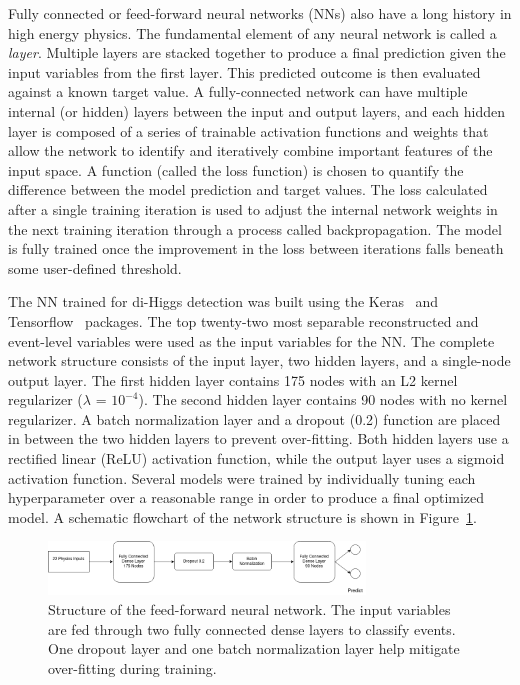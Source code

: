 \label{sec:NN}
Fully connected or feed-forward neural networks (NNs) also have a long history in high energy physics. The fundamental element of any neural network is called a \textit{layer}. Multiple layers are stacked together to produce a final prediction given the input variables from the first layer. This predicted outcome is then evaluated against a known target value. A fully-connected network can have multiple internal (or hidden) layers between the input and output layers, and each hidden layer is composed of a series of trainable activation functions and weights that allow the network to identify and iteratively combine important features of the input space. A function (called the loss function) is chosen to quantify the difference between the model prediction and target values. The loss calculated after a single training iteration is used to adjust the internal network weights in the next training iteration through a process called backpropagation. The model is fully trained once the improvement in the loss between iterations falls beneath some user-defined threshold.

The NN trained for di-Higgs detection was built using the Keras~\cite{chollet2015keras} and Tensorflow~\cite{tensorflow} packages. The top twenty-two most separable reconstructed and event-level variables were used as the input variables for the NN. The complete network structure consists of the input layer, two hidden layers, and a single-node output layer. The first hidden layer contains 175 nodes with an L2 kernel regularizer ($\lambda$ = $10^{-4}$). The second hidden layer contains 90 nodes with no kernel regularizer. A batch normalization layer and a dropout (0.2) function are placed in between the two hidden layers to prevent over-fitting. Both hidden layers use a rectified linear (ReLU) activation function, while the output layer uses a sigmoid activation function. Several models were trained by individually tuning each hyperparameter over a reasonable range in order to produce a final optimized model. A schematic flowchart of the network structure is shown in Figure~\ref{fig:nn}.

\begin{figure}[!h] 
\begin{center}
\includegraphics*[width=0.75\textwidth] {ffNN/figures/flowchart_ffNN.png}
\caption{Structure of the feed-forward neural network. The input variables are fed through two fully connected dense layers to classify events. One dropout layer and one batch normalization layer help mitigate over-fitting during training.}
  \label{fig:nn}
\end{center}
\end{figure}

